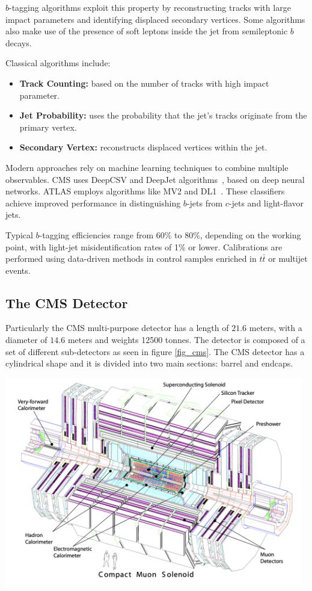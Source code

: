 $b$-tagging algorithms exploit this property by reconstructing tracks with large impact parameters and identifying displaced secondary vertices. Some algorithms also make use of the presence of soft leptons inside the jet from semileptonic $b$ decays.

Classical algorithms include:
\begin{itemize}
    \item \textbf{Track Counting:} based on the number of tracks with high impact parameter.
    \item \textbf{Jet Probability:} uses the probability that the jet’s tracks originate from the primary vertex.
    \item \textbf{Secondary Vertex:} reconstructs displaced vertices within the jet.
\end{itemize}

Modern approaches rely on machine learning techniques to combine multiple observables. CMS uses DeepCSV and DeepJet algorithms~\parencite{CMS:2017wtu}, based on deep neural networks. ATLAS employs algorithms like MV2 and DL1~\parencite{ATLAS:2019bwq}. These classifiers achieve improved performance in distinguishing $b$-jets from $c$-jets and light-flavor jets.

Typical $b$-tagging efficiencies range from 60\% to 80\%, depending on the working point, with light-jet misidentification rates of 1\% or lower. Calibrations are performed using data-driven methods in control samples enriched in $t\bar{t}$ or multijet events.

\subsection{The CMS Detector}
Particularly the CMS multi-purpose detector has a length of $21.6$ meters, with a diameter of $14.6$ meters and weights 12500 tonnes. The detector is composed of a set of different sub-detectors as seen in figure \ref{fig_cms}. The CMS detector has a cylindrical shape and it is divided into two main sections: barrel and endcaps. 

\begin{center}
	\includegraphics[width=0.98\textwidth]{Images/CMS.png}
	\label{fig_cms}
\end{center}

